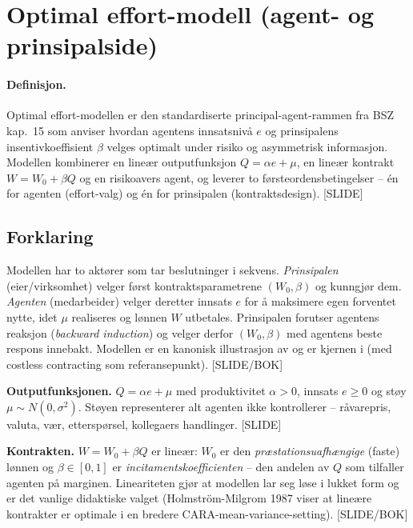 \section{Optimal effort-modell (agent- og prinsipalside)}\label{thr:optimal-effort-model}

\paragraph{Definisjon.} Optimal effort-modellen er den standardiserte principal-agent-rammen fra BSZ kap.\ 15 som anviser hvordan agentens innsatsnivå $e$ og prinsipalens insentivkoeffisient $\beta$ velges optimalt under risiko og asymmetrisk informasjon. Modellen kombinerer en lineær outputfunksjon $Q=\alpha e+\mu$, en lineær kontrakt $W=W_0+\beta Q$ og en risikoavers agent, og leverer to førsteordensbetingelser -- én for agenten (effort-valg) og én for prinsipalen (kontraktsdesign). [SLIDE]

\subsection*{Forklaring}

Modellen har to aktører som tar beslutninger i sekvens. \emph{Prinsipalen} (eier/virksomhet) velger først kontraktsparametrene $(W_0,\beta)$ og kunngjør dem. \emph{Agenten} (medarbeider) velger deretter innsats $e$ for å maksimere egen forventet nytte, idet $\mu$ realiseres og lønnen $W$ utbetales. Prinsipalen forutser agentens reaksjon (\emph{backward induction}) og velger derfor $(W_0,\beta)$ med agentens beste respons innebakt. Modellen er en kanonisk illustrasjon av  og er kjernen i  (med costless contracting som referansepunkt). [SLIDE/BOK]

\textbf{Outputfunksjonen.} $Q=\alpha e+\mu$ med produktivitet $\alpha>0$, innsats $e\ge 0$ og støy $\mu\sim N(0,\sigma^{2})$. Støyen representerer alt agenten ikke kontrollerer -- råvarepris, valuta, vær, etterspørsel, kollegaers handlinger. [SLIDE]

\textbf{Kontrakten.} $W=W_0+\beta Q$ er lineær: $W_0$ er den \emph{præstationsuafhængige} (faste) lønnen og $\beta\in[0,1]$ er \emph{incitamentskoefficienten} -- den andelen av $Q$ som tilfaller agenten på marginen. Lineariteten gjør at modellen lar seg løse i lukket form og er det vanlige didaktiske valget (Holmström-Milgrom 1987 viser at lineære kontrakter er optimale i en bredere CARA-mean-variance-setting). [SLIDE/BOK]

